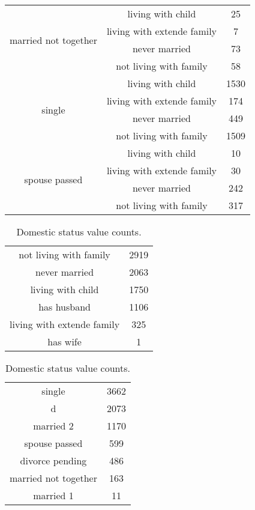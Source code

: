 \begin{table}[!h]
\begin{minipage}{.7\textwidth}
\begin{tabular}{ccc}
        \multirow{4}{*}{married not together} & living with child          &     25 \\
        & living with extende family &      7 \\
        & never married              &     73 \\
        & not living with family     &     58 \\
        \multirow{4}{*}{single} & living with child          &   1530 \\
        & living with extende family &    174 \\
        & never married              &    449 \\
        & not living with family     &   1509 \\
        \multirow{4}{*}{spouse passed} & living with child          &     10 \\
        & living with extende family &     30 \\
        & never married              &    242 \\
        & not living with family     &    317 \\
    \end{tabular}
\end{minipage}
\end{table}

\begin{table}[!h]
    \begin{minipage}{.5\textwidth}
    \caption{Domestic relationship type value counts.}
    \label{tab:domestic_relationship_type_value_counts}
    \centering
    \begin{tabular}{cc}
        not living with family & 2919 \\
        never married & 2063 \\
        living with child & 1750 \\
        has husband & 1106 \\
        living with extende family & 325 \\
        has wife & 1 \\
    \end{tabular}
    \end{minipage}
    \begin{minipage}{.5\textwidth}
    \centering
    \caption{Domestic status value counts.}
    \label{tab:domestic_status_value_counts}
    \begin{tabular}{cc}
        single & 3662 \\
        d & 2073 \\
        married 2 & 1170 \\
        spouse passed & 599 \\
        divorce pending & 486 \\
        married not together & 163 \\
        married 1 & 11 \\
    \end{tabular}
    \end{minipage}
\end{table}


